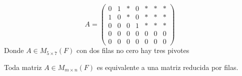 \documentclass[12pt,a4paper]{book}
\begin{document}
    \begin{ejemplo}
    \label{ej:8}
        \begin{equation*}
            A=
            \begin{pmatrix}
                0 & 1 & * & 0 & * & * & *\\
                1 & 0 & * & 0 & * & * & *\\
                0 & 0 & 0 & 1 & * & * & *\\
                0 & 0 & 0 & 0 & 0 & 0 & 0\\
                0 & 0 & 0 & 0 & 0 & 0 & 0
            \end{pmatrix}
        \end{equation*}
        Donde $A\in M_{5\times7}(F)$ con dos filas no cero hay tres pivotes
    \end{ejemplo}

    \vspace{1cm}

    \begin{proposicion}
    \label{prop:4}
        Toda matriz $A\in M_{m\times n}(F)$ es equivalente a una matriz reducida por filas.
    \end{proposicion}
\end{document}
